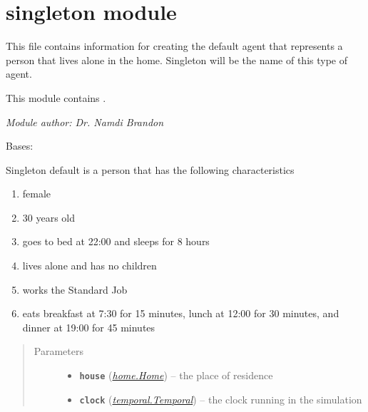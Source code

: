 \documentclass[letterpaper,10pt,english]{sphinxmanual}
\begin{document}
\section{singleton module}
\label{singleton::doc}\label{singleton:module-singleton}\label{singleton:singleton-module}
This file contains information for creating the default agent that represents a person that lives alone in the home. Singleton will be the name of this type of agent.

This module contains {\hyperref[singleton:singleton.Singleton]{\emph{}}}.

\emph{Module author: Dr. Namdi Brandon}

\begin{fulllineitems}
\label{singleton:singleton.Singleton}
Bases: {\hyperref[person:person.Person]{\emph{}}}

Singleton default is a person that has the following characteristics
\begin{enumerate}
\item {} 
female

\item {} 
30 years old

\item {} 
goes to bed at 22:00 and sleeps for 8 hours

\item {} 
lives alone and has no children

\item {} 
works the Standard Job

\item {} 
eats breakfast at 7:30 for 15 minutes, lunch at 12:00 for 30 minutes,     and dinner at 19:00 for 45 minutes

\end{enumerate}
\begin{quote}\begin{description}
\item[{Parameters}] \leavevmode\begin{itemize}
\item {} 
\textbf{\texttt{house}} ({\hyperref[home:home.Home]{\emph{\emph{home.Home}}}}) -- the place of residence

\item {} 
\textbf{\texttt{clock}} ({\hyperref[temporal:temporal.Temporal]{\emph{\emph{temporal.Temporal}}}}) -- the clock running in the simulation


\end{itemize}
\end{description}
\end{quote}
\end{fulllineitems}
\end{document}
